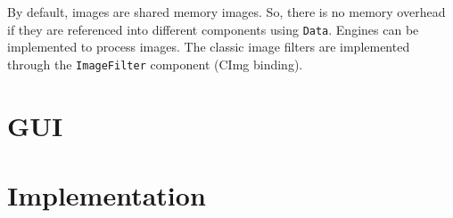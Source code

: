 \noindent By default, images are shared memory images. So, there is no memory overhead if they are referenced into different components using \texttt{Data}. Engines can be implemented to process images. The classic image filters are implemented through the \texttt{ImageFilter} component (CImg binding).

\section{GUI}


\section{Implementation}

